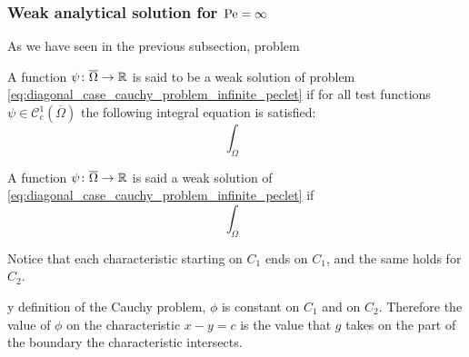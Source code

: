 \subsubsection{Weak analytical solution for \texorpdfstring{$\mathrm{Pe} =
\infty$}{infinite Péclet's number}}


As we have seen in the previous subsection, problem 

\begin{definition}
	A function $\psi \colon \overline{\Omega} \rightarrow \mathbb{R}$ is said to be a
	weak solution of problem
	\eqref{eq:diagonal_case_cauchy_problem_infinite_peclet} if for all test
	functions $\psi \in \mathcal{C}^1_c (\overline{\Omega})$ the following
	integral equation is satisfied:
	\begin{equation}
		\int_\Omega 
	\end{equation}
	
	A function $\psi \colon \overline{\Omega} \rightarrow \mathbb{R}$
	is said a weak solution of
	\eqref{eq:diagonal_case_cauchy_problem_infinite_peclet} if 
	\[
		\int_\Omega 
	\]
\end{definition}


Notice that each characteristic starting on $C_1$ ends on $C_1$, and the same
holds for $C_2$. 

y definition of the Cauchy problem, $\phi$ is
constant on $C_1$ and on $C_2$. Therefore the value of $\phi$ on the
characteristic $x - y = c$ is the value that $g$ takes on the part of the
boundary the characteristic intersects.